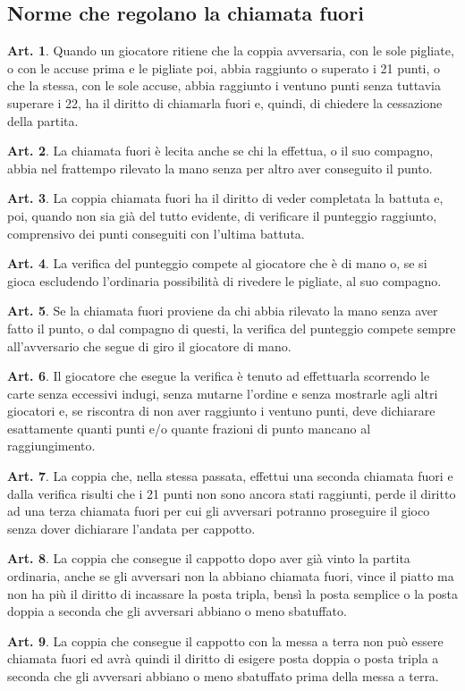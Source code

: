 \documentclass[italian,a4paper]{book}
\theoremstyle{definition}
\newtheorem{art}{Art.}
\begin{document}
\subsection{Norme che regolano la chiamata fuori}
\begin{art}\label{chiamata.fuori}
Quando un giocatore ritiene che la coppia avversaria, con le sole pigliate, o con le accuse prima e le pigliate poi, abbia raggiunto o superato i 21 punti, o che la stessa, con le sole accuse, abbia raggiunto i ventuno punti senza tuttavia superare i 22, ha il diritto di chiamarla fuori e, quindi, di chiedere la cessazione della partita.
\end{art}
\begin{art}\label{chiamata.fuori2}
La chiamata fuori è lecita anche se chi la effettua, o il suo compagno, abbia nel frattempo rilevato la mano senza per altro aver conseguito il punto.
\end{art}
\begin{art}
La coppia chiamata fuori ha il diritto di veder completata la battuta e, poi, quando non sia già del tutto evidente, di verificare il punteggio raggiunto, comprensivo dei punti conseguiti con l'ultima battuta.
\end{art}
\begin{art}
La verifica del punteggio compete al giocatore che è di mano o, se si gioca escludendo l'ordinaria possibilità di rivedere le pigliate, al suo compagno.
\end{art}
\begin{art}
Se la chiamata fuori proviene da chi abbia rilevato la mano senza aver fatto il punto, o dal compagno di questi, la verifica del punteggio compete sempre all'avversario che segue di giro il giocatore di mano.
\end{art}
\begin{art}
Il giocatore che esegue la verifica è tenuto ad effettuarla scorrendo le carte senza eccessivi indugi, senza mutarne l'ordine e  senza mostrarle agli altri giocatori e, se riscontra di non aver raggiunto i ventuno punti, deve dichiarare esattamente quanti punti e/o quante frazioni di punto mancano al raggiungimento.
\end{art}
\begin{art}
La coppia che, nella stessa passata, effettui una seconda chiamata fuori e dalla verifica risulti che i 21 punti non sono ancora stati raggiunti, perde il diritto ad una terza chiamata fuori per cui gli avversari potranno proseguire il gioco senza dover dichiarare l'andata per cappotto.
\end{art}
\begin{art}
La coppia che consegue il cappotto dopo aver già vinto la partita ordinaria, anche se gli avversari non la abbiano chiamata fuori, vince il piatto ma non ha più il diritto di incassare la posta tripla, bensì la posta semplice o la posta doppia a seconda che gli avversari abbiano o meno sbatuffato.
\end{art}
\begin{art}
La coppia che consegue il cappotto con la messa a terra non può essere chiamata fuori ed avrà quindi il diritto di esigere  posta doppia o  posta tripla a seconda che gli avversari abbiano o meno sbatuffato prima della messa a terra.
\end{art}
\end{document}
